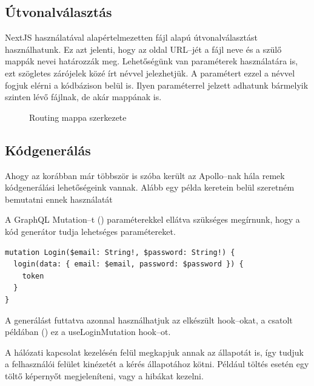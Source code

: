 \subsection{Útvonalválasztás}
NextJS használatával alapértelmezetten fájl alapú útvonalválasztást használhatunk.
Ez azt jelenti, hogy az oldal URL–jét a fájl neve és a szülő mappák nevei határozzák meg.
Lehetőségünk van paraméterek használatára is, ezt szögletes zárójelek közé írt névvel jelezhetjük.
A paramétert ezzel a névvel fogjuk elérni a kódbázison belül is.
Ilyen paraméterrel jelzett adhatunk bármelyik szinten lévő fájlnak, de akár mappának is.

\begin{figure}
	\caption{Routing mappa szerkezete}
	\label{fig:next}
\end{figure}


\subsection{Kódgenerálás}

Ahogy az korábban már többször is szóba került az Apollo–nak hála remek kódgenerálási lehetőségeink vannak.
Alább egy példa keretein belül szeretném bemutatni ennek használatát

A GraphQL Mutation–t () paraméterekkel ellátva szükséges megírnunk, hogy a kód generátor tudja lehetséges paramétereket. 
\begin{lstlisting}[style=ES6, caption={Login Mutation},label={lst:login}]
mutation Login($email: String!, $password: String!) {
  login(data: { email: $email, password: $password }) {
    token
  }
}
\end{lstlisting}

A generálást futtatva azonnal használhatjuk az elkészült hook–okat, a csatolt példában () ez a useLoginMutation hook–ot.

A hálózati kapcsolat kezelésén felül megkapjuk annak az állapotát is, így tudjuk a felhasználói felület kinézetét a kérés állapotához kötni.
Például töltés esetén egy töltő képernyőt megjeleníteni, vagy a hibákat kezelni.

